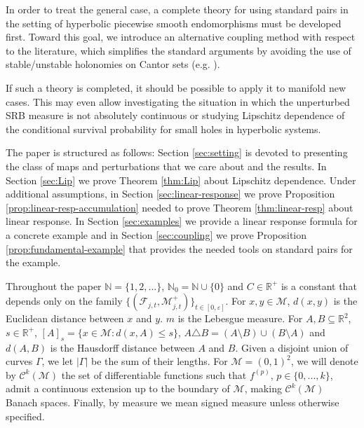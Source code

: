\documentclass{amsart}
\numberwithin{equation}{section}
\newcommand\ve{\varepsilon}
\renewcommand{\le}{\leqslant}
\newcommand\cC{{\mathcal C}}
\newcommand\cF{{\mathcal F}}
\newcommand\cM{{\mathcal M}}
\newcommand\bN{{\mathbb N}}
\newcommand\bR{{\mathbb R}}
\begin{document}
In order to treat the general case, a complete theory for using standard pairs in the setting of hyperbolic piecewise smooth endomorphisms must be developed first. Toward this goal, we introduce an alternative coupling method with respect to the literature, which simplifies the standard arguments by avoiding the use of stable/unstable holonomies on Cantor sets (e.g. \cite{C99}). 

If such a theory is completed, it should be possible to apply it to manifold new cases. This may even allow investigating the situation in which the unperturbed SRB measure is not absolutely continuous or studying Lipschitz dependence of the conditional survival probability for small holes in hyperbolic systems.

The paper is structured as follows: Section \ref{sec:setting} is devoted to presenting the class of maps and perturbations that we care about and the results. In Section \ref{sec:Lip} we prove Theorem \ref{thm:Lip} about Lipschitz dependence. Under additional assumptions, in Section \ref{sec:linear-response} we prove Proposition \ref{prop:linear-resp-accumulation} needed to prove Theorem \ref{thm:linear-resp} about linear response. In Section \ref{sec:examples} we provide a linear response formula for a concrete example and in Section \ref{sec:coupling} we prove Proposition \ref{prop:fundamental-example} that provides the needed tools on standard pairs for the example.

Throughout the paper \(\bN = \{1,2,...\}\), \(\bN_0 = \bN \cup \{0\}\) and \(C \in \bR^+\) is a constant that depends only on the family \(\{(\cF_{j,t}, \cM_{j,t}^{+})\}_{t \in [0,\ve]}\). For \(x,y \in \cM\), \(d(x,y)\) is the Euclidean distance between \(x\) and \(y\). \(m\) is the Lebesgue measure. For \(A, B \subseteq \bR^2\), \(s \in \bR^+\), \([A]_{s} = \{x \in \cM: d(x,A) \le s\}\), \(A \triangle B = (A \setminus B) \cup (B \setminus A)\) and \(d(A,B)\) is the Hausdorff distance between \(A\) and \(B\). Given a disjoint union of curves \(\Gamma\), we let \(\left|\Gamma\right|\) be the sum of their lengths. For \(\cM = (0,1)^2\), we will denote by \(\cC^k(\cM)\) the set of differentiable functions such that \(f^{(p)}\), \(p \in \{0,...,k\}\), admit a continuous extension up to the boundary of \(\cM\), making \(\cC^k(\cM)\) Banach spaces. Finally, by measure we mean signed measure unless otherwise specified.\\
\end{document}
